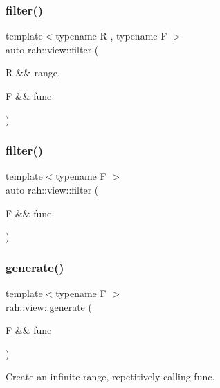 \subsubsection{\texorpdfstring{filter()}{filter()}\hspace{0.1cm}{\footnotesize\ttfamily [1/2]}}
{\footnotesize\ttfamily template$<$typename R , typename F $>$ \\
auto rah\+::view\+::filter (\begin{DoxyParamCaption}\item[{R \&\&}]{range,  }\item[{F \&\&}]{func }\end{DoxyParamCaption})}

\mbox{\label{namespacerah_1_1view_a315ba2143c833b24d05481c68b6cf2da}} 
\subsubsection{\texorpdfstring{filter()}{filter()}\hspace{0.1cm}{\footnotesize\ttfamily [2/2]}}
{\footnotesize\ttfamily template$<$typename F $>$ \\
auto rah\+::view\+::filter (\begin{DoxyParamCaption}\item[{F \&\&}]{func }\end{DoxyParamCaption})}

\mbox{\label{namespacerah_1_1view_a05a3de164c8d1fde6ca761119d90a789}} 
\subsubsection{\texorpdfstring{generate()}{generate()}}
{\footnotesize\ttfamily template$<$typename F $>$ \\
rah\+::view\+::generate (\begin{DoxyParamCaption}\item[{F \&\&}]{func }\end{DoxyParamCaption})}



Create an infinite range, repetitively calling func. 


